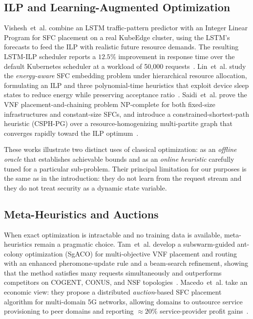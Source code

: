 \subsection{ILP and Learning-Augmented Optimization}

Vishesh~et~al. combine an LSTM traffic-pattern predictor with an
Integer Linear Program for SFC placement on a real KubeEdge cluster,
using the LSTM's forecasts to feed the ILP with realistic future
resource demands. The resulting LSTM-ILP scheduler reports a $12.5\%$
improvement in response time over the default Kubernetes scheduler at
a workload of 50{,}000 requests~\cite{vishesh_optimized_2025}.
Lin~et~al. study the \emph{energy-aware} SFC embedding problem under
hierarchical resource allocation, formulating an ILP and three
polynomial-time heuristics that exploit device sleep states to reduce
energy while preserving acceptance
ratio~\cite{lin_energy-aware_2023}. Saidi~et~al. prove the VNF
placement-and-chaining problem NP-complete for both fixed-size
infrastructures and constant-size SFCs, and introduce a
constrained-shortest-path heuristic (CSPH-PG) over a
resource-homogenizing multi-partite graph that converges rapidly
toward the ILP optimum~\cite{saidi_constrained_2024}.

These works illustrate two distinct uses of classical optimization:
as an \textit{offline oracle} that establishes achievable bounds and
as an \textit{online heuristic} carefully tuned for a particular
sub-problem. Their principal limitation for our purposes is the same
as in the introduction: they do not learn from the request stream and
they do not treat security as a dynamic state variable.

\subsection{Meta-Heuristics and Auctions}

When exact optimization is intractable and no training data is
available, meta-heuristics remain a pragmatic choice.
Tam~et~al. develop a subswarm-guided ant-colony optimization (SgACO)
for multi-objective VNF placement and routing with an enhanced
pheromone-update rule and a beam-search refinement, showing that the
method satisfies many requests simultaneously and outperforms
competitors on COGENT, CONUS, and NSF
topologies~\cite{tam_subswarm-guided_2024}. Macedo~et~al. take an
economic view: they propose a distributed \emph{auction}-based SFC
placement algorithm for multi-domain 5G networks, allowing domains
to outsource service provisioning to peer domains and reporting
${\approx}20\%$ service-provider profit
gains~\cite{macedo_distributed_2024}.

